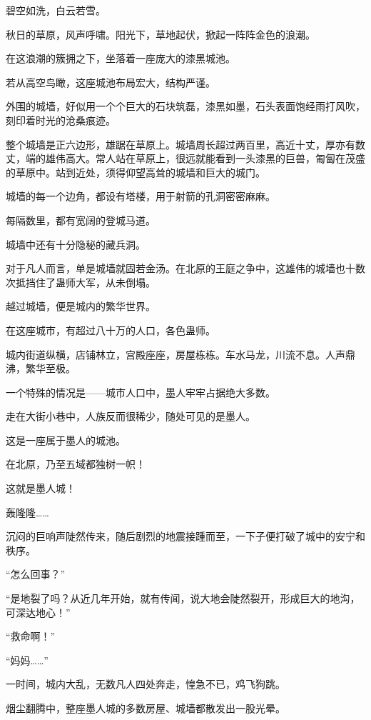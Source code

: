 
\begin{this_body}

碧空如洗，白云若雪。

秋日的草原，风声呼啸。阳光下，草地起伏，掀起一阵阵金色的浪潮。

在这浪潮的簇拥之下，坐落着一座庞大的漆黑城池。

若从高空鸟瞰，这座城池布局宏大，结构严谨。

外围的城墙，好似用一个个巨大的石块筑磊，漆黑如墨，石头表面饱经雨打风吹，刻印着时光的沧桑痕迹。

整个城墙是正六边形，雄踞在草原上。城墙周长超过两百里，高近十丈，厚亦有数丈，端的雄伟高大。常人站在草原上，很远就能看到一头漆黑的巨兽，匍匐在茂盛的草原中。站到近处，须得仰望高耸的城墙和巨大的城门。

城墙的每一个边角，都设有塔楼，用于射箭的孔洞密密麻麻。

每隔数里，都有宽阔的登城马道。

城墙中还有十分隐秘的藏兵洞。

对于凡人而言，单是城墙就固若金汤。在北原的王庭之争中，这雄伟的城墙也十数次抵挡住了蛊师大军，从未倒塌。

越过城墙，便是城内的繁华世界。

在这座城市，有超过八十万的人口，各色蛊师。

城内街道纵横，店铺林立，宫殿座座，房屋栋栋。车水马龙，川流不息。人声鼎沸，繁华至极。

一个特殊的情况是——城市人口中，墨人牢牢占据绝大多数。

走在大街小巷中，人族反而很稀少，随处可见的是墨人。

这是一座属于墨人的城池。

在北原，乃至五域都独树一帜！

这就是墨人城！

轰隆隆……

沉闷的巨响声陡然传来，随后剧烈的地震接踵而至，一下子便打破了城中的安宁和秩序。

“怎么回事？”

“是地裂了吗？从近几年开始，就有传闻，说大地会陡然裂开，形成巨大的地沟，可深达地心！”

“救命啊！”

“妈妈……”

一时间，城内大乱，无数凡人四处奔走，惶急不已，鸡飞狗跳。

烟尘翻腾中，整座墨人城的多数房屋、城墙都散发出一股光晕。


\end{this_body}
